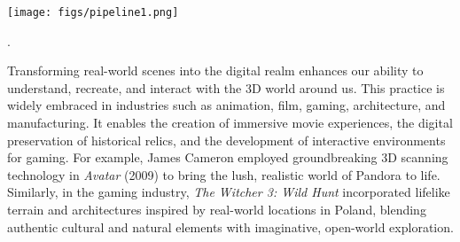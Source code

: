 
\begin{figure*} [ht]
  \centering
  \texttt{[image: figs/pipeline1.png]}
   \label{fig_overview1}
\end{figure*}.



Transforming real-world scenes into the digital realm enhances our ability to understand, recreate, and interact with the 3D world around us. This practice is widely embraced in industries such as animation, film, gaming, architecture, and manufacturing. It enables the creation of immersive movie experiences, the digital preservation of historical relics, and the development of interactive environments for gaming.
For example, James Cameron employed groundbreaking 3D scanning technology in \textit{Avatar} (2009) to bring the lush, realistic world of Pandora to life. Similarly, in the gaming industry, \textit{The Witcher 3: Wild Hunt} incorporated lifelike terrain and architectures inspired by real-world locations in Poland, blending authentic cultural and natural elements with imaginative, open-world exploration.

